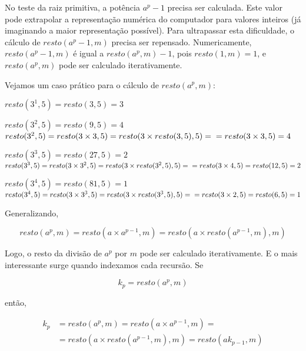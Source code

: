 \documentclass[a4paper,12pt,oneside,onecolumn]{uerj/uerj}
\begin{document}
No teste da raiz primitiva, a potência $a^p-1$ precisa ser calculada. Este valor pode extrapolar a representação numérica do computador para valores inteiros (já imaginando a maior representação possível). Para ultrapassar esta dificuldade, o cálculo de $resto(a^{p}-1,m)$ precisa ser repensado. Numericamente, $resto(a^{p}-1,m)$ é igual a $resto(a^{p},m)-1$, pois $resto(1,m)=1$, e $resto(a^{p},m)$ pode ser calculado iterativamente. 

Vejamos um caso prático para o cálculo de $resto(a^{p},m)$:

\begin{lcircp}
    \item $resto(3^{1},5)=resto(3,5)=3$
    \item $resto(3^{2},5)=resto(9,5)=4$\\
          $resto(3^{2},5)=resto(3\times 3,5)=resto(3\times resto(3,5),5)=\\
          =resto(3\times 3,5)=4$
    \item $resto(3^{3},5)=resto(27,5)=2$\\
          $resto(3^{3},5)=resto(3\times 3^2,5)=resto(3\times resto(3^2,5),5)=\\
          =resto(3\times 4,5)=resto(12,5)=2$
    \item $resto(3^{4},5)=resto(81,5)=1$\\
          $resto(3^{4},5)=resto(3\times 3^3,5)=resto(3\times resto(3^3,5),5)=\\
          =resto(3\times 2,5)=resto(6,5)=1$\\
\end{lcircp}

\noindent Generalizando,

\begin{equation}
resto(a^{p},m)=resto(a\times a^{p-1},m)=resto(a\times resto(a^{p-1},m),m)
\end{equation}

\noindent Logo, o resto da divisão de $a^{p}$ por $m$ pode ser calculado iterativamente. E o mais interessante surge quando indexamos cada recursão. Se

\begin{equation}
k_p = resto(a^{p},m)
\end{equation}

\noindent então,

\begin{equation}
  \begin{array}{rl}
  k_{p}&=resto(a^{p},m)=resto(a\times a^{p-1},m)=\\
       &=resto(a\times resto(a^{p-1},m),m)=resto(ak_{p-1},m)
  \end{array}
\end{equation}
\end{document}

